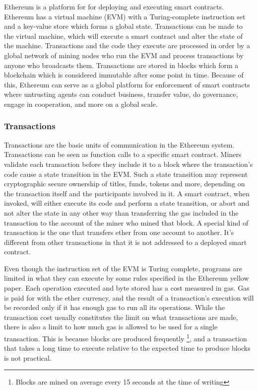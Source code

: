 Ethereum \cite{wood2018ethereum} is a platform for for deploying and executing smart contracts. Ethereum has a virtual machine (EVM) with a Turing-complete instruction set and a key-value store which forms a global state. Transactions can be made to the virtual machine, which will execute a smart contract and alter the state of the machine. Transactions and the code they execute are processed in order by a global network of mining nodes who run the EVM and process transactions by anyone who broadcasts them. Transactions are stored in blocks which form a blockchain which is considered immutable after some point in time. Because of this, Ethereum can serve as a global platform for enforcement of smart contracts where untrusting agents can conduct business, transfer value, do governance, engage in cooperation, and more on a global scale.

\subsubsection{Transactions}
Transactions are the basic units of communication in the Ethereum system. Transactions can be seen as function calls to a specific smart contract. Miners validate each transaction before they include it to a block where the transaction's code cause a state transition in the EVM. Such a state transition may represent cryptographic secure ownership of titles, funds, tokens and more, depending on the transaction itself and the participants involved in it. A smart contract, when invoked, will either execute its code and perform a state transition, or abort and not alter the state in any other way than transferring the gas included in the transaction to the account of the miner who mined that block. A special kind of transaction is the one that transfers ether from one account to another. It's different from other transactions in that it is not addressed to a deployed smart contract.

Even though the instruction set of the EVM is Turing complete, programs are limited in what they can execute by some rules specified in the Ethereum yellow paper. Each operation executed and byte stored has a cost measured in gas. Gas is paid for with the ether currency, and the result of a transaction's execution will be recorded only if it has enough gas to run all its operations. While the transaction cost usually constitutes the limit on what transactions are made, there is also a limit to how much gas is allowed to be used for a single transaction. This is because blocks are produced frequently \footnote{Blocks are mined on average every 15 seconds at the time of writing}, and a transaction that takes a long time to execute relative to the expected time to produce blocks is not practical. 

